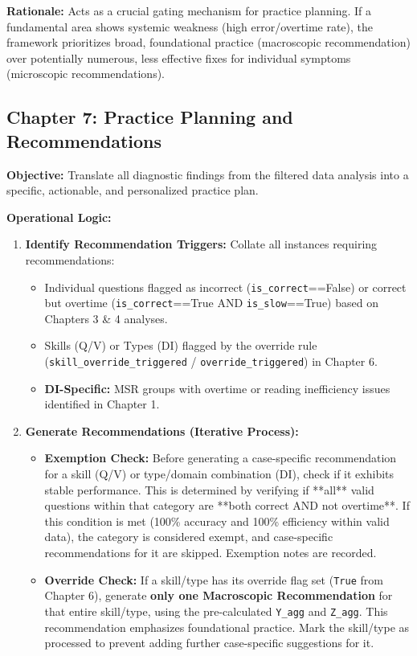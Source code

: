 \documentclass{article}
\begin{document}
\textbf{Rationale:} Acts as a crucial gating mechanism for practice planning. If a fundamental area shows systemic weakness (high error/overtime rate), the framework prioritizes broad, foundational practice (macroscopic recommendation) over potentially numerous, less effective fixes for individual symptoms (microscopic recommendations).

\subsection{Chapter 7: Practice Planning and Recommendations}

\textbf{Objective:} Translate all diagnostic findings from the filtered data analysis into a specific, actionable, and personalized practice plan.

\textbf{Operational Logic:}
\begin{enumerate}
    \item \textbf{Identify Recommendation Triggers:} Collate all instances requiring recommendations:
    \begin{itemize}
        \item Individual questions flagged as incorrect (\texttt{is\_correct}==False) or correct but overtime (\texttt{is\_correct}==True AND \texttt{is\_slow}==True) based on Chapters 3 \& 4 analyses.
        \item Skills (Q/V) or Types (DI) flagged by the override rule (\texttt{skill\_override\_triggered} / \texttt{override\_triggered}) in Chapter 6.
        \item \textbf{DI-Specific:} MSR groups with overtime or reading inefficiency issues identified in Chapter 1.
    \end{itemize}
    \item \textbf{Generate Recommendations (Iterative Process):}
    \begin{itemize}
        \item \textbf{Exemption Check:} Before generating a case-specific recommendation for a skill (Q/V) or type/domain combination (DI), check if it exhibits stable performance. This is determined by verifying if **all** valid questions within that category are **both correct AND not overtime**. If this condition is met (100\% accuracy and 100\% efficiency within valid data), the category is considered exempt, and case-specific recommendations for it are skipped. Exemption notes are recorded.
        \item \textbf{Override Check:} If a skill/type has its override flag set (\texttt{True} from Chapter 6), generate \textbf{only one Macroscopic Recommendation} for that entire skill/type, using the pre-calculated \texttt{Y\_agg} and \texttt{Z\_agg}. This recommendation emphasizes foundational practice. Mark the skill/type as processed to prevent adding further case-specific suggestions for it.

\end{itemize}
\end{enumerate}
\end{document}
